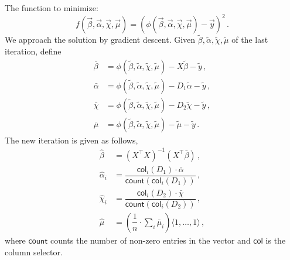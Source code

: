 \documentclass{tufte-handout}
\begin{document}
  The function to minimize:
  \[
    f(\vec{\beta}, \vec{\alpha}, \vec{\chi}, \vec{\mu}) =
    (\phi(\vec{\beta}, \vec{\alpha}, \vec{\chi}, \vec{\mu}) - \vec{y})^2 \, .
  \]
  We approach the solution by gradient descent.
  Given $\tilde{\beta}, \tilde{\alpha}, \tilde{\chi}, \tilde{\mu}$ of the last
  iteration, define
  \begin{align*}
    \bar{\beta}
    &= \phi(\tilde{\beta}, \tilde{\alpha}, \tilde{\chi}, \tilde{\mu})
     - X\tilde{\beta} - \tilde{y} \, , \\
    \bar{\alpha}
    &= \phi(\tilde{\beta}, \tilde{\alpha}, \tilde{\chi}, \tilde{\mu})
     - D_1\tilde{\alpha} - \tilde{y} \, , \\
    \bar{\chi}
    &= \phi(\tilde{\beta}, \tilde{\alpha}, \tilde{\chi}, \tilde{\mu})
     - D_2\tilde{\chi} - \tilde{y} \, , \\
    \bar{\mu}
    &= \phi(\tilde{\beta}, \tilde{\alpha}, \tilde{\chi}, \tilde{\mu})
     - \tilde{\mu} - \tilde{y} \, .
  \end{align*}
  The new iteration is given as follows,
  \newcommand \Count{\mathsf{count}}
  \newcommand \Col{\mathsf{col}}
  \begin{align*}
    \hat{\beta}
    &= (X^{\top}X)^{-1}(X^{\top}\bar{\beta}) \, , \\
    \hat{\alpha}_i
    &= \dfrac{\Col_i(D_1) \cdot \bar{\alpha}}{\Count(\Col_i(D_1))} \, , \\
    \hat{\chi}_i
    &= \dfrac{\Col_i(D_2) \cdot \bar{\chi}}{\Count(\Col_i(D_2))} \, , \\
    \hat{\mu}
    &=
      \left( \dfrac{1}{n} \cdot \sum_{i} \bar{\mu}_i \right)
      \langle 1, \hdots, 1 \rangle \, ,
  \end{align*}
  where $\Count$ counts the number of non-zero entries in the vector
  and $\Col$ is the column selector.
\end{document}
